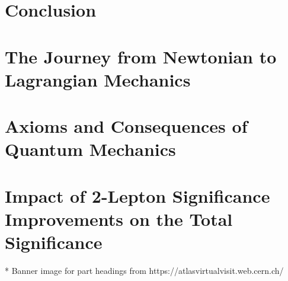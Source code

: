 \documentclass[12pt,titlepage,oneside,table,xcdraw]{book}
\begin{document}
\chapter{Conclusion}
\label{chap:conc}


\begin{appendices}
\chapter{The Journey from Newtonian to Lagrangian Mechanics}
\label{app:C2L}



\chapter{Axioms and Consequences of Quantum Mechanics}

\label{app:QM}

\chapter{Impact of 2-Lepton Significance Improvements on the Total Significance}
\label{app:reqsig}


\end{appendices}

\backmatter  %


* Banner image for part headings from https://atlasvirtualvisit.web.cern.ch/
\end{document}
